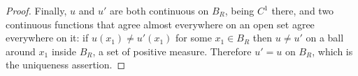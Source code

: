 \begin{proof}
Finally, $u$ and $u'$ are both continuous on $B_R$, being $C^1$ there, and two
continuous functions that agree almost everywhere on an open set agree
everywhere on it: if $u(x_1)\ne u'(x_1)$ for some $x_1\in B_R$ then
$u\ne u'$ on a ball around $x_1$ inside $B_R$, a set of positive measure.
Therefore $u'=u$ on $B_R$, which is the uniqueness assertion.
\end{proof}
